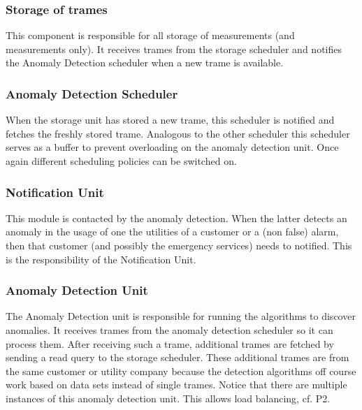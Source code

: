 
\subsubsection{Storage of trames}

\npar This component is responsible for all storage of measurements (and
measurements only). It receives trames from the storage scheduler and notifies
the Anomaly Detection scheduler when a new trame is available.

\subsubsection{Anomaly Detection Scheduler}

\npar When the storage unit has stored a new trame, this scheduler is notified
and fetches the freshly stored trame. Analogous to the other scheduler this
scheduler serves as a buffer to prevent overloading on the anomaly detection
unit. Once again different scheduling policies can be switched on.

\subsubsection{Notification Unit}

\npar This module is contacted by the anomaly detection. When the latter detects
an anomaly in the usage of one the utilities of a customer or a (non false)
alarm, then that customer (and possibly the emergency services) needs to
notified. This is the responsibility of the Notification Unit.

\subsubsection{Anomaly Detection Unit}

\npar The Anomaly Detection unit is responsible for running the algorithms to
discover anomalies. It receives trames from the anomaly detection scheduler so
it can process them. After receiving such a trame, additional trames are fetched
by sending a read query to the storage scheduler. These additional trames
are from the same customer or utility company because the detection algorithms
off course work based on data sets instead of single trames. Notice that there
are multiple instances of this anomaly detection unit. This allows load
balancing, cf. P2.

